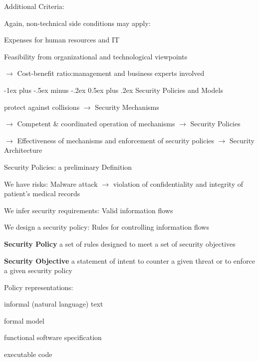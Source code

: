 \documentclass[a4paper]{article}
\makeatletter
\renewcommand{\note}[2]{\begin{noteBox} \textbf{#1} #2 \end{noteBox}}
\renewcommand{\section}{\@startsection{section}{1}{0mm}%
                                {-1ex plus -.5ex minus -.2ex}%
                                {0.5ex plus .2ex}%
                                {\normalfont\large\bfseries}}
\makeatother
\begin{document}
\begin{multicols}{3}
    Additional Criteria:
    \begin{itemize*}
        \item Again, non-technical side conditions may apply:
        \begin{itemize*}
            \item Expenses for human resources and IT
            \item Feasibility from organizational and technological viewpoints
        \end{itemize*}
        \item $\rightarrow$  Cost-benefit ratio:management and business experts involved
    \end{itemize*}

    \section{Security Policies and Models}
    \begin{itemize*}
        \item protect against collisions $\rightarrow$ Security Mechanisms
        \item $\rightarrow$  Competent \& coordinated operation of mechanisms $\rightarrow$  Security Policies
        \item $\rightarrow$  Effectiveness of mechanisms and enforcement of security policies $\rightarrow$  Security Architecture
    \end{itemize*}

    Security Policies: a preliminary Definition
    \begin{itemize*}
        \item We have risks:  Malware attack $\rightarrow$ violation of confidentiality and integrity of patient’s medical records
        \item We infer security requirements: Valid information flows
        \item We design a security policy: Rules for controlling information flows
    \end{itemize*}

    \note{Security Policy}{a set of rules designed to meet a set of security objectives}

    \note{Security Objective}{a statement of intent to counter a given threat or to enforce a given security policy}

    Policy representations:
    \begin{itemize*}
        \item informal (natural language) text
        \item formal model
        \item functional software specification
        \item executable code
    \end{itemize*}


\end{multicols}
\end{document}
